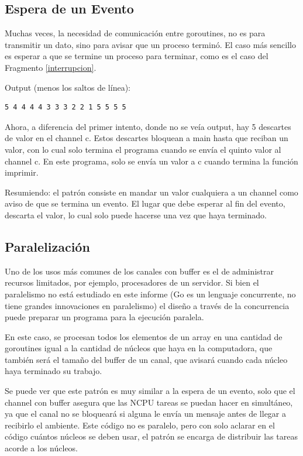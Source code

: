 \documentclass{article}
\begin{document}
\subsection{Espera de un Evento}
Muchas veces, la necesidad de comunicación entre goroutines, no es para transmitir un dato, sino para avisar que un proceso terminó. El caso más sencillo es esperar a que se termine un proceso para terminar, como es el caso del Fragmento \ref{interrupcion}.


Output (menos los saltos de línea):
\begin{verbatim}
5 4 4 4 4 3 3 3 2 2 1 5 5 5 5 
\end{verbatim}

Ahora, a diferencia del primer intento, donde no se veía output, hay 5 descartes de valor en el channel c. Estos descartes bloquean a main hasta que reciban un valor, con lo cual solo termina el programa cuando se envía el quinto valor al channel c. En este programa, solo se envía un valor a c cuando termina la función imprimir.

Resumiendo: el patrón consiste en mandar un valor cualquiera a un channel como aviso de que se termina un evento. El lugar que debe esperar al fin del evento, descarta el valor, lo cual solo puede hacerse una vez que haya terminado.

\subsection{Paralelización}
Uno de los usos más comunes de los canales con buffer es el de administrar recursos limitados, por ejemplo, procesadores de un servidor. Si bien el paralelismo no está estudiado en este informe (Go es un lenguaje concurrente, no tiene grandes innovaciones en paralelismo) el diseño a través de la concurrencia puede preparar un programa para la ejecución paralela.

En este caso, se procesan todos los elementos de un array en una cantidad de goroutines igual a la cantidad de núcleos que haya en la computadora, que también será el tamaño del buffer de un canal, que avisará cuando cada núcleo haya terminado su trabajo.



Se puede ver que este patrón es muy similar a la espera de un evento, solo que el channel con buffer asegura que las NCPU tareas se puedan hacer en simultáneo, ya que el canal no se bloqueará si alguna le envía un mensaje antes de llegar a recibirlo el ambiente. Este código no es paralelo, pero con solo aclarar en el código cuántos núcleos se deben usar, el patrón se encarga de distribuir las tareas acorde a los núcleos.
\end{document}
